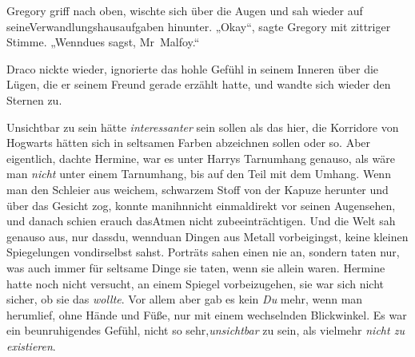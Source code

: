 Gregory griff nach oben, wischte sich über die Augen und sah wieder auf seineVerwandlungshausaufgaben hinunter. „Okay“, sagte Gregory mit zittriger Stimme. „Wenndues sagst, Mr~Malfoy.“

Draco nickte wieder, ignorierte das hohle Gefühl in seinem Inneren über die Lügen, die er seinem Freund gerade erzählt hatte, und wandte sich wieder den Sternen zu.


Unsichtbar zu sein hätte \emph{interessanter} sein sollen als das hier, die Korridore von Hogwarts hätten sich in seltsamen Farben abzeichnen sollen oder so. Aber eigentlich, dachte Hermine, war es unter Harrys Tarnumhang genauso, als wäre man \emph{nicht} unter einem Tarnumhang, bis auf den Teil mit dem Umhang. Wenn man den Schleier aus weichem, schwarzem Stoff von der Kapuze herunter und über das Gesicht zog, konnte manihnnicht einmaldirekt vor seinen Augensehen, und danach schien erauch dasAtmen nicht zubeeinträchtigen. Und die Welt sah genauso aus, nur dassdu, wennduan Dingen aus Metall vorbeigingst, keine kleinen Spiegelungen vondirselbst sahst. Porträts sahen einen nie an, sondern taten nur, was auch immer für seltsame Dinge sie taten, wenn sie allein waren. Hermine hatte noch nicht versucht, an einem Spiegel vorbeizugehen, sie war sich nicht sicher, ob sie das \emph{wollte}. Vor allem aber gab es kein \emph{Du} mehr, wenn man herumlief, ohne Hände und Füße, nur mit einem wechselnden Blickwinkel. Es war ein beunruhigendes Gefühl, nicht so sehr,\emph{unsichtbar} zu sein, als vielmehr \emph{nicht zu existieren}.

